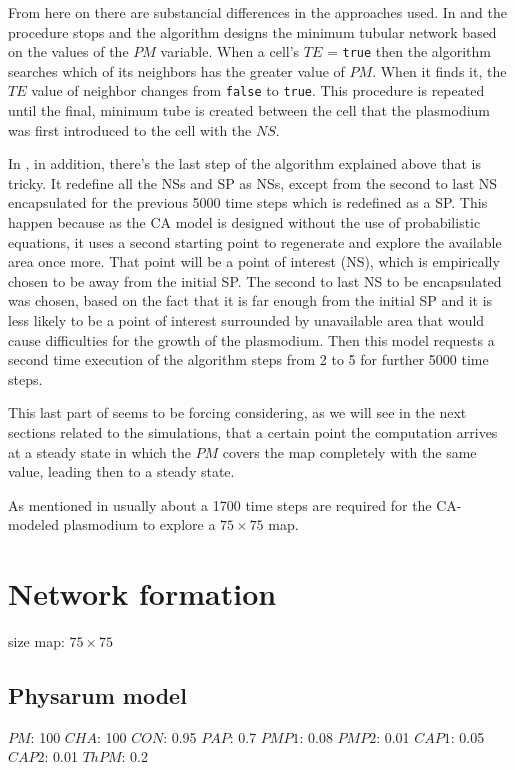 \par
From here on there are substancial differences in the approaches used. In \cite{dourvas2016gpgpu} and \cite{tsompanas2015cellular} the procedure stops and the algorithm designs the minimum tubular network based on the values of the $PM$ variable. When a cell’s $TE$ = \texttt{true} then the algorithm searches which of its neighbors has the greater value of $PM$. When it finds it, the $TE$ value of neighbor changes from \texttt{false} to \texttt{true}. This procedure is repeated until the final, minimum tube is created between the cell that the plasmodium was first introduced to the cell with the $NS$. 

\par
In \cite{Tsompanas2016}, in addition, there's the last step of the algorithm explained above that is tricky. It redefine all the NSs and SP as NSs, except from the second to last NS encapsulated for the previous 5000 time steps which is redefined as a SP. This happen because as the CA model is designed without the use of probabilistic equations, it uses a second starting point to regenerate and explore the available area once more. That point will be a point of interest (NS), which is empirically chosen to be away from the initial SP. The second to last NS to be encapsulated was chosen, based on the fact that it is far enough from the initial SP and it is less likely to be a point of interest surrounded by unavailable area that would cause difficulties for the growth of the plasmodium. Then this model requests a second time execution of the algorithm steps from 2 to 5 for further 5000 time steps.

\par
This last part of seems to be forcing considering, as we will see in the next sections related to the simulations, that a certain point the computation arrives at a steady state in which the $PM$ covers the map completely with the same value, leading then to a steady state.

\par
As mentioned in \cite{dourvas2016gpgpu} usually about a 1700 time steps are required for the CA-modeled plasmodium to explore a $75 \times 75$ map.

\section{Network formation}
size map: $75 \times 75$

\subsection{Physarum model}
$PM$: 100
$CHA$: 100
$CON$: 0.95
$PAP$: 0.7
$PMP1$: 0.08
$PMP2$: 0.01
$CAP1$: 0.05
$CAP2$: 0.01
$ThPM$: 0.2

